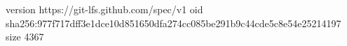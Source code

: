 version https://git-lfs.github.com/spec/v1
oid sha256:977f717dff3e1dce10d851650dfa274cc085be291b9c44cde5c8e54e25214197
size 4367
